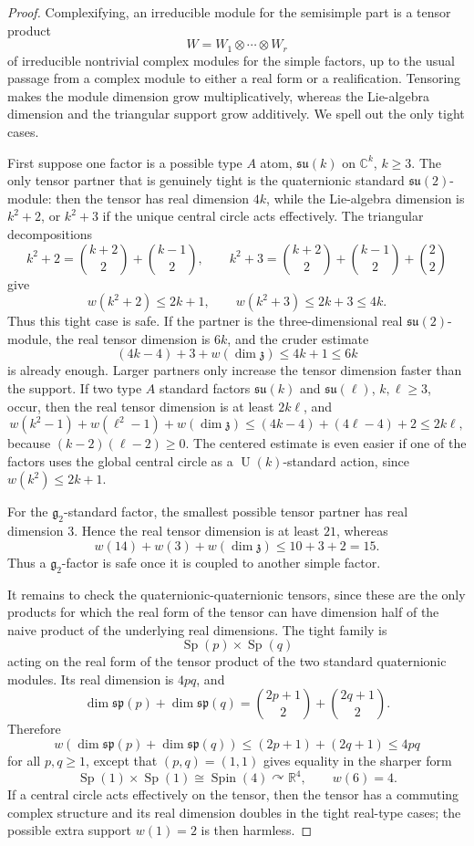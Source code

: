 \documentclass[11pt]{article}
\theoremstyle{remark}
\newcommand{\RR}{\mathbb{R}}
\newcommand{\CC}{\mathbb{C}}
\newcommand{\fz}{\mathfrak{z}}
\newcommand{\su}{\mathfrak{su}}
\newcommand{\spalg}{\mathfrak{sp}}
\newcommand{\Spin}{\operatorname{Spin}}
\newcommand{\U}{\operatorname{U}}
\newcommand{\Sp}{\operatorname{Sp}}
\begin{document}
\begin{proof}
Complexifying, an irreducible module for the semisimple part is a tensor product
\[
  W=W_1\otimes\cdots\otimes W_r
\]
of irreducible nontrivial complex modules for the simple factors, up to the usual passage from a complex module to either a real form or a realification.  Tensoring makes the module dimension grow multiplicatively, whereas the Lie-algebra dimension and the triangular support grow additively.  We spell out the only tight cases.

First suppose one factor is a possible type \(A\) atom, \(\su(k)\) on \(\CC^k\), \(k\geq 3\).  The only tensor partner that is genuinely tight is the quaternionic standard \(\su(2)\)-module: then the tensor has real dimension \(4k\), while the Lie-algebra dimension is \(k^2+2\), or \(k^2+3\) if the unique central circle acts effectively.  The triangular decompositions
\[
  k^2+2=\binom{k+2}{2}+\binom{k-1}{2},
  \qquad
  k^2+3=\binom{k+2}{2}+\binom{k-1}{2}+\binom22
\]
give
\[
  w(k^2+2)\leq 2k+1,
  \qquad
  w(k^2+3)\leq 2k+3\leq 4k.
\]
Thus this tight case is safe.  If the partner is the three-dimensional real \(\su(2)\)-module, the real tensor dimension is \(6k\), and the cruder estimate
\[
  (4k-4)+3+w(\dim\fz)
  \leq 4k+1
  \leq 6k
\]
is already enough.  Larger partners only increase the tensor dimension faster than the support.  If two type \(A\) standard factors \(\su(k)\) and \(\su(\ell)\), \(k,\ell\geq 3\), occur, then the real tensor dimension is at least \(2k\ell\), and
\[
  w(k^2-1)+w(\ell^2-1)+w(\dim\fz)
  \leq (4k-4)+(4\ell-4)+2
  \leq 2k\ell,
\]
because \((k-2)(\ell-2)\geq 0\).  The centered estimate is even easier if one of the factors uses the global central circle as a \(\U(k)\)-standard action, since \(w(k^2)\leq 2k+1\).

For the \(\mathfrak g_2\)-standard factor, the smallest possible tensor partner has real dimension \(3\).  Hence the real tensor dimension is at least \(21\), whereas
\[
  w(14)+w(3)+w(\dim\fz)
  \leq 10+3+2=15.
\]
Thus a \(\mathfrak g_2\)-factor is safe once it is coupled to another simple factor.

It remains to check the quaternionic-quaternionic tensors, since these are the only products for which the real form of the tensor can have dimension half of the naive product of the underlying real dimensions.  The tight family is
\[
  \Sp(p)\times\Sp(q)
\]
acting on the real form of the tensor product of the two standard quaternionic modules.  Its real dimension is \(4pq\), and
\[
  \dim\spalg(p)+\dim\spalg(q)
  =\binom{2p+1}{2}+\binom{2q+1}{2}.
\]
Therefore
\[
  w(\dim\spalg(p)+\dim\spalg(q))
  \leq (2p+1)+(2q+1)
  \leq 4pq
\]
for all \(p,q\geq 1\), except that \((p,q)=(1,1)\) gives equality in the sharper form
\[
  \Sp(1)\times\Sp(1)\cong\Spin(4)\curvearrowright\RR^4,
  \qquad
  w(6)=4.
\]
If a central circle acts effectively on the tensor, then the tensor has a commuting complex structure and its real dimension doubles in the tight real-type cases; the possible extra support \(w(1)=2\) is then harmless.


\end{proof}
\end{document}

